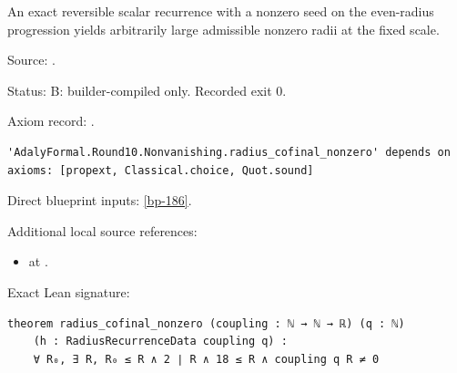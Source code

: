 \begin{theorem}[bp-333]
\label{bp-333}
\leanok
An exact reversible scalar recurrence with a nonzero seed on the even-radius progression yields arbitrarily large admissible nonzero radii at the fixed scale.

\par Source: \texttt{}.
\par Status: B: builder-compiled only. Recorded exit 0.
\par Axiom record: \texttt{}.
\begin{verbatim}
'AdalyFormal.Round10.Nonvanishing.radius_cofinal_nonzero' depends on axioms: [propext, Classical.choice, Quot.sound]
\end{verbatim}
\par Direct blueprint inputs: \ref{bp-186}.
\par Additional local source references:
\begin{itemize}
\item \texttt{} at \texttt{}.
\end{itemize}
\par Exact Lean signature:
\begin{verbatim}
theorem radius_cofinal_nonzero (coupling : ℕ → ℕ → ℝ) (q : ℕ)
    (h : RadiusRecurrenceData coupling q) :
    ∀ R₀, ∃ R, R₀ ≤ R ∧ 2 ∣ R ∧ 18 ≤ R ∧ coupling q R ≠ 0
\end{verbatim}
\end{theorem}

